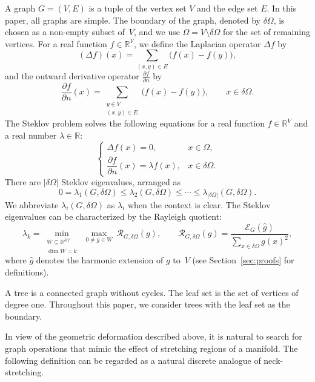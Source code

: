 \documentclass[11pt]{article}
\theoremstyle{definition}
\theoremstyle{remark}
\newcommand{\RR}{\mathbb{R}}
\newcommand{\dO}{\delta\Omega}
\newcommand{\Om}{\Omega}
\begin{document}
A graph $G=(V,E)$ is a tuple of the vertex set $V$ and the edge set $E$.
In this paper, all graphs are simple.
The boundary of the graph, denoted by $\dO$, is chosen as a non-empty subset of~$V$,
and we use $\Om=V\setminus \dO$ for the set of remaining vertices.
For a real function $f\in\RR^V$, we define the Laplacian operator $\Delta f$ by
\begin{equation}\label{eq:lap}
(\Delta f)(x)=\sum_{(x,y)\in E}\bigl(f(x)-f(y)\bigr),
\end{equation}
and the outward derivative operator $\frac{\partial f}{\partial n}$ by
\begin{equation}\label{eq:normal}
\frac{\partial f}{\partial n}(x)=\sum_{\substack{y\in V\\(x,y)\in E}}\bigl(f(x)-f(y)\bigr),\qquad x\in\dO.
\end{equation}
The Steklov problem solves the following equations for a real function $f\in\RR^V$ and a real number $\lambda\in\RR$:
\begin{equation}\label{eq:steklov}
\begin{cases}
\Delta f(x)=0, & x\in\Om,\\[2pt]
\dfrac{\partial f}{\partial n}(x)=\lambda f(x), & x\in\dO.
\end{cases}
\end{equation}
There are $|\dO|$ Steklov eigenvalues, arranged as
\[
0=\lambda_1(G,\dO)\le \lambda_2(G,\dO)\le \cdots\le \lambda_{|\dO|}(G,\dO).
\]
We abbreviate $\lambda_i(G,\dO)$ as $\lambda_i$ when the context is clear.
The Steklov eigenvalues can be characterized by the Rayleigh quotient:
\begin{equation}\label{eq:minmax}
\lambda_k=\min_{\substack{W\subseteq\RR^{\dO}\\\dim W=k}}\ \max_{0\neq g\in W}\ \mathcal{R}_{G,\dO}(g),\qquad
\mathcal{R}_{G,\dO}(g)=\frac{\mathcal{E}_G(\widehat{g})}{\sum_{x\in\dO}g(x)^2},
\end{equation}
where $\widehat{g}$ denotes the harmonic extension of $g$ to~$V$ (see Section~\ref{sec:proofs} for definitions). 

A tree is a connected graph without cycles.
The leaf set is the set of vertices of degree one.
Throughout this paper, we consider trees with the leaf set as the boundary.

In view of the geometric deformation described above, it is natural to search for graph operations that mimic the effect of stretching regions of a manifold. The following definition can be regarded as a natural discrete analogue of neck-stretching. 
\end{document}

